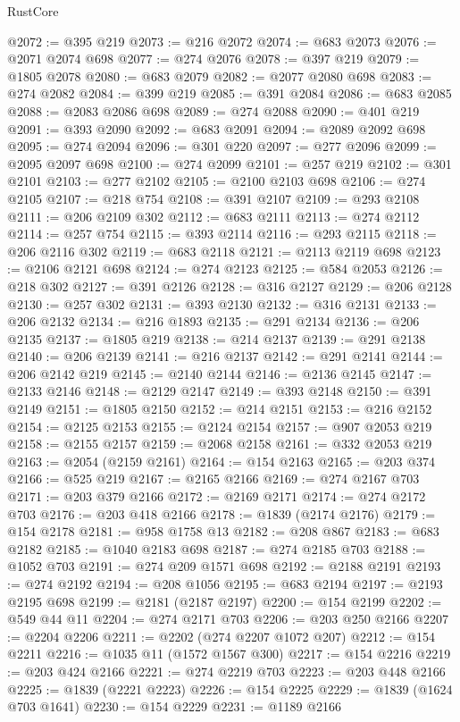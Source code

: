 \begin{lexlean}{RustCore}
\begin{coremodule}
@2072 := @395 @219
@2073 := @216 @2072
@2074 := @683 @2073
@2076 := @2071 @2074 @698
@2077 := @274 @2076
@2078 := @397 @219
@2079 := @1805 @2078
@2080 := @683 @2079
@2082 := @2077 @2080 @698
@2083 := @274 @2082
@2084 := @399 @219
@2085 := @391 @2084
@2086 := @683 @2085
@2088 := @2083 @2086 @698
@2089 := @274 @2088
@2090 := @401 @219
@2091 := @393 @2090
@2092 := @683 @2091
@2094 := @2089 @2092 @698
@2095 := @274 @2094
@2096 := @301 @220
@2097 := @277 @2096
@2099 := @2095 @2097 @698
@2100 := @274 @2099
@2101 := @257 @219
@2102 := @301 @2101
@2103 := @277 @2102
@2105 := @2100 @2103 @698
@2106 := @274 @2105
@2107 := @218 @754
@2108 := @391 @2107
@2109 := @293 @2108
@2111 := @206 @2109 @302
@2112 := @683 @2111
@2113 := @274 @2112
@2114 := @257 @754
@2115 := @393 @2114
@2116 := @293 @2115
@2118 := @206 @2116 @302
@2119 := @683 @2118
@2121 := @2113 @2119 @698
@2123 := @2106 @2121 @698
@2124 := @274 @2123
@2125 := @584 @2053
@2126 := @218 @302
@2127 := @391 @2126
@2128 := @316 @2127
@2129 := @206 @2128
@2130 := @257 @302
@2131 := @393 @2130
@2132 := @316 @2131
@2133 := @206 @2132
@2134 := @216 @1893
@2135 := @291 @2134
@2136 := @206 @2135
@2137 := @1805 @219
@2138 := @214 @2137
@2139 := @291 @2138
@2140 := @206 @2139
@2141 := @216 @2137
@2142 := @291 @2141
@2144 := @206 @2142 @219
@2145 := @2140 @2144
@2146 := @2136 @2145
@2147 := @2133 @2146
@2148 := @2129 @2147
@2149 := @393 @2148
@2150 := @391 @2149
@2151 := @1805 @2150
@2152 := @214 @2151
@2153 := @216 @2152
@2154 := @2125 @2153
@2155 := @2124 @2154
@2157 := @907 @2053 @219
@2158 := @2155 @2157
@2159 := @2068 @2158
@2161 := @332 @2053 @219
@2163 := @2054 (@2159 @2161)
@2164 := @154 @2163
@2165 := @203 @374
@2166 := @525 @219
@2167 := @2165 @2166
@2169 := @274 @2167 @703
@2171 := @203 @379 @2166
@2172 := @2169 @2171
@2174 := @274 @2172 @703
@2176 := @203 @418 @2166
@2178 := @1839 (@2174 @2176)
@2179 := @154 @2178
@2181 := @958 @1758 @13
@2182 := @208 @867
@2183 := @683 @2182
@2185 := @1040 @2183 @698
@2187 := @274 @2185 @703
@2188 := @1052 @703
@2191 := @274 @209 @1571 @698
@2192 := @2188 @2191
@2193 := @274 @2192
@2194 := @208 @1056
@2195 := @683 @2194
@2197 := @2193 @2195 @698
@2199 := @2181 (@2187 @2197)
@2200 := @154 @2199
@2202 := @549 @44 @11
@2204 := @274 @2171 @703
@2206 := @203 @250 @2166
@2207 := @2204 @2206
@2211 := @2202 (@274 @2207 @1072 @207)
@2212 := @154 @2211
@2216 := @1035 @11 (@1572 @1567 @300)
@2217 := @154 @2216
@2219 := @203 @424 @2166
@2221 := @274 @2219 @703
@2223 := @203 @448 @2166
@2225 := @1839 (@2221 @2223)
@2226 := @154 @2225
@2229 := @1839 (@1624 @703 @1641)
@2230 := @154 @2229
@2231 := @1189 @2166

\end{coremodule}
\end{lexlean}
